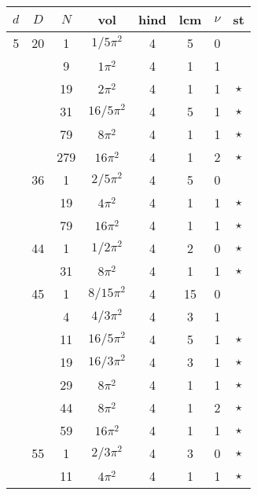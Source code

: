 \documentclass[12pt]{amsart}
\providecommand{\DIFadd}[1]{{\protect\color{blue}\uwave{#1}}} %
\providecommand{\DIFdel}[1]{{\protect\color{red}\sout{#1}}}                      %
\providecommand{\DIFaddbegin}{} %
\providecommand{\DIFaddend}{} %
\providecommand{\DIFdelbegin}{} %
\providecommand{\DIFdelend}{} %
\begin{document}
\begin{tabular}{ccc|ccccc}
$d$ & $D$ & $N$ & vol & hind & lcm & $\nu$ & st\\
\hline
5 & 20 & 1 & \DIFdelbegin \DIFdel{$1/5\pi^2$ }\DIFdelend \DIFaddbegin \DIFadd{$(1/5)\pi^2$ }\DIFaddend & 4 & 5 & 0 &  \\
 &  & 9 & \DIFdelbegin \DIFdel{$1\pi^2$ }\DIFdelend \DIFaddbegin \DIFadd{$\pi^2$ }\DIFaddend & 4 & 1 & 1 &  \\
 &  & 19 & $2\pi^2$ & 4 & 1 & 1 & $\star$ \\
 &  & 31 & \DIFdelbegin \DIFdel{$16/5\pi^2$ }\DIFdelend \DIFaddbegin \DIFadd{$(16/5)\pi^2$ }\DIFaddend & 4 & 5 & 1 & $\star$ \\
 &  & 79 & $8\pi^2$ & 4 & 1 & 1 & $\star$ \\
 &  & 279 & $16\pi^2$ & 4 & 1 & 2 & $\star$ \\
 & 36 & 1 & \DIFdelbegin \DIFdel{$2/5\pi^2$ }\DIFdelend \DIFaddbegin \DIFadd{$(2/5)\pi^2$ }\DIFaddend & 4 & 5 & 0 &  \\
 &  & 19 & $4\pi^2$ & 4 & 1 & 1 & $\star$ \\
 &  & 79 & $16\pi^2$ & 4 & 1 & 1 & $\star$ \\
 & 44 & 1 & \DIFdelbegin \DIFdel{$1/2\pi^2$ }\DIFdelend \DIFaddbegin \DIFadd{$(1/2)\pi^2$ }\DIFaddend & 4 & 2 & 0 & $\star$ \\
 &  & 31 & $8\pi^2$ & 4 & 1 & 1 & $\star$ \\
 & 45 & 1 & \DIFdelbegin \DIFdel{$8/15\pi^2$ }\DIFdelend \DIFaddbegin \DIFadd{$(8/15)\pi^2$ }\DIFaddend & 4 & 15 & 0 &  \\
 &  & 4 & \DIFdelbegin \DIFdel{$4/3\pi^2$ }\DIFdelend \DIFaddbegin \DIFadd{$(4/3)\pi^2$ }\DIFaddend & 4 & 3 & 1 &  \\
 &  & 11 & \DIFdelbegin \DIFdel{$16/5\pi^2$ }\DIFdelend \DIFaddbegin \DIFadd{$(16/5)\pi^2$ }\DIFaddend & 4 & 5 & 1 & $\star$ \\
 &  & 19 & \DIFdelbegin \DIFdel{$16/3\pi^2$ }\DIFdelend \DIFaddbegin \DIFadd{$(16/3)\pi^2$ }\DIFaddend & 4 & 3 & 1 & $\star$ \\
 &  & 29 & $8\pi^2$ & 4 & 1 & 1 & $\star$ \\
 &  & 44 & $8\pi^2$ & 4 & 1 & 2 & $\star$ \\
 &  & 59 & $16\pi^2$ & 4 & 1 & 1 & $\star$ \\
 & 55 & 1 & \DIFdelbegin \DIFdel{$2/3\pi^2$ }\DIFdelend \DIFaddbegin \DIFadd{$(2/3)\pi^2$ }\DIFaddend & 4 & 3 & 0 & $\star$ \\
 &  & 11 & $4\pi^2$ & 4 & 1 & 1 & $\star$ \\

\end{tabular}
\end{document}
